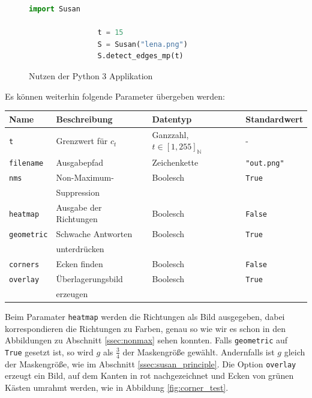 \documentclass[a4paper, 11pt]{report}
\theoremstyle{definition}
\begin{document}
		\begin{figure}[H] \centering
			\begin{lstlisting}[language=Python]
				import Susan

				t = 15
				S = Susan("lena.png")
				S.detect_edges_mp(t)
			\end{lstlisting}
		\caption{Nutzen der Python 3 Applikation}
		\label{fig:minimal-working-example}
		\end{figure}

		Es können weiterhin folgende Parameter übergeben werden:
		\begin{center}
			\begin{tabular}{|l|l|l|l|}
				\hline
				\textbf{Name} 		& \textbf{Beschreibung} 	& \textbf{Datentyp}							& \textbf{Standardwert}	\\
				\hline
				\texttt{t}			& Grenzwert	für $c_t$		& Ganzzahl, $t \in [1,255]_\mathbb{N}$		& -\\
				\hline
				\texttt{filename}	& Ausgabepfad				& Zeichenkette								& \texttt{"{}out.png"}\\
				\hline
				\texttt{nms}		& Non-Maximum-				& Boolesch									& \texttt{True}\\
									& Suppression & & \\
				\hline
				\texttt{heatmap}	& Ausgabe der Richtungen 	& Boolesch									& \texttt{False}\\
				\hline
				\texttt{geometric}	& Schwache Antworten 		& Boolesch 									& \texttt{True} \\
									& unterdrücken & & \\
				\hline
				\texttt{corners}	& Ecken finden				& Boolesch									& \texttt{False} \\
				\hline
				\texttt{overlay}	& Überlagerungsbild 		& Boolesch									& \texttt{True} \\
									& erzeugen & & \\
				\hline
			\end{tabular}
		\end{center}

		Beim Paramater \texttt{heatmap} werden die Richtungen als Bild ausgegeben, dabei korrespondieren die Richtungen zu Farben, genau so wie wir es schon in den Abbildungen zu Abschnitt \ref{ssec:nonmax} sehen konnten.
		Falls \texttt{geometric} auf \texttt{True} gesetzt ist, so wird $g$ als $\frac{3}{4}$ der Maskengröße gewählt. Andernfalls ist $g$ gleich der Maskengröße, wie im Abschnitt \ref{ssec:susan_principle}.
		Die Option \texttt{overlay} erzeugt ein Bild, auf dem Kanten in rot nachgezeichnet und Ecken von grünen Kästen umrahmt werden, wie in Abbildung \ref{fig:corner_test}.
\end{document}
